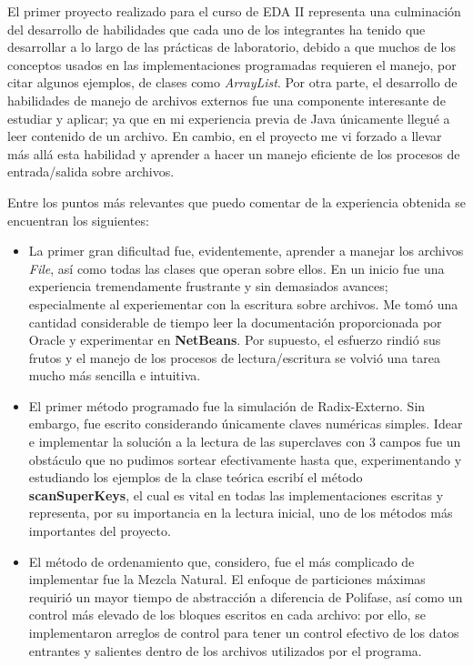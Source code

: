 \documentclass[letterpaper,12pt]{extarticle}
\begin{document}
\begin{itemize}
    El primer proyecto realizado para el curso de EDA II representa una culminación del desarrollo de habilidades que cada uno de los integrantes ha tenido que desarrollar a lo largo de las prácticas de laboratorio, debido a que muchos de los conceptos usados en las implementaciones programadas requieren el manejo, por citar algunos ejemplos, de clases como \textit{ArrayList}. Por otra parte, el desarrollo de habilidades de manejo de archivos externos fue una componente interesante de estudiar y aplicar; ya que en mi experiencia previa de Java únicamente llegué a leer contenido de un archivo. En cambio, en el proyecto me vi forzado a llevar más allá esta habilidad y aprender a hacer un manejo eficiente de los procesos de entrada/salida sobre archivos.
    
    Entre los puntos más relevantes que puedo comentar de la experiencia obtenida se encuentran los siguientes:
    
    
\begin{itemize}
\item La primer gran dificultad fue, evidentemente, aprender a manejar los archivos \textit{File}, así como todas las clases que operan sobre ellos. En un inicio fue una experiencia tremendamente frustrante y sin demasiados avances; especialmente al experiementar con la escritura sobre archivos. Me tomó una cantidad considerable de tiempo leer la documentación proporcionada por Oracle y experimentar en \textbf{NetBeans}. Por supuesto, el esfuerzo rindió sus frutos y el manejo de los procesos de lectura/escritura se volvió una tarea mucho más sencilla e intuitiva.

\item El primer método programado fue la simulación de Radix-Externo. Sin embargo, fue escrito considerando únicamente claves numéricas simples. Idear e implementar la solución a la lectura de las superclaves con 3 campos fue un obstáculo que no pudimos sortear efectivamente hasta que, experimentando y estudiando los ejemplos de la clase teórica escribí el método \textbf{scanSuperKeys}, el cual es vital en todas las implementaciones escritas y representa, por su importancia en la lectura inicial, uno de los métodos más importantes del proyecto. 

\item El método de ordenamiento que, considero, fue el más complicado de implementar fue la Mezcla Natural. El enfoque de particiones máximas requirió un mayor tiempo de abstracción a diferencia de Polifase, así como un control más elevado de los bloques escritos en cada archivo: por ello, se implementaron arreglos de control para tener un control efectivo de los datos entrantes y salientes dentro de los archivos utilizados por el programa.


\end{itemize}
\end{itemize}
\end{document}
